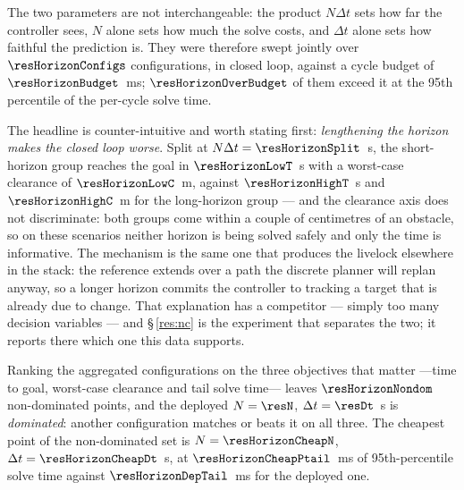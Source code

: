 
\label{res:horizon}


The two parameters are not interchangeable: the product $N\Delta t$ sets how far the controller sees, $N$ alone sets how much the solve costs, and $\Delta t$ alone sets how faithful the prediction is. They were therefore swept jointly over $\resHorizonConfigs$ configurations, in closed loop, against a cycle budget of $\resHorizonBudget$~ms; $\resHorizonOverBudget$ of them exceed it at the 95th percentile of the per-cycle solve time.

The headline is counter-intuitive and worth stating first: \emph{lengthening the horizon makes the closed loop worse}. Split at $N\Delta t=\resHorizonSplit$~s, the short-horizon group reaches the goal in $\resHorizonLowT$~s with a worst-case clearance of $\resHorizonLowC$~m, against $\resHorizonHighT$~s and $\resHorizonHighC$~m for the long-horizon group --- and the clearance axis does not discriminate: both groups come within a couple of centimetres of an obstacle, so on these scenarios neither horizon is being solved safely and only the time is informative. The mechanism is the same one that produces the livelock elsewhere in the stack: the reference extends over a path the discrete planner will replan anyway, so a longer horizon commits the controller to tracking a target that is already due to change. That explanation has a competitor --- simply too many decision variables --- and \S\,\ref{res:nc} is the experiment that separates the two; it reports there which one this data supports.

Ranking the aggregated configurations on the three objectives that matter ---time to goal, worst-case clearance and tail solve time--- leaves $\resHorizonNondom$ non-dominated points, and the deployed $N=\resN$, $\Delta t=\resDt$~s is \emph{dominated}: another configuration matches or beats it on all three. The cheapest point of the non-dominated set is $N=\resHorizonCheapN$, $\Delta t=\resHorizonCheapDt$~s, at $\resHorizonCheapPtail$~ms of 95th-percentile solve time against $\resHorizonDepTail$~ms for the deployed one.


